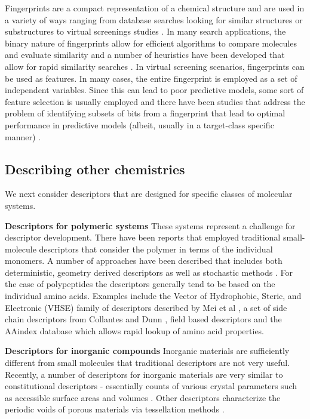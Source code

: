 \documentclass[letterpaper, 12pt]{article}
\begin{document}
Fingerprints are a compact representation of a chemical structure and
are used in a variety of ways ranging from database searches looking
for similar structures or substructures to virtual screenings studies
\cite{Sun:2006kx}. In many search applications, the binary nature of
fingerprints allow for efficient algorithms to compare molecules and
evaluate similarity and a number of heuristics have been developed
that allow for rapid similarity searches
\cite{Baldi:2008aa,Swamidass:2007ab}. In virtual screening scenarios,
fingerprints can be used as features. In many cases, the entire
fingerprint is employed as a set of independent variables. Since this
can lead to poor predictive models, some sort of feature selection is
usually employed and there have been studies that address the problem
of identifying subsets of bits from a fingerprint that lead to optimal
performance in predictive models (albeit, usually in a target-class
specific manner) \cite{Xue:2004fk}.

\subsection{Describing other chemistries}

We next consider descriptors that are designed for specific classes of
molecular systems.

\textbf{Descriptors for polymeric systems} These systems represent a
challenge for descriptor development. There have been reports that
employed traditional small-molecule descriptors
\cite{Mattioni:2002dq,Katritzky:1998cr} that consider the polymer in
terms of the individual monomers. A number of approaches have been
described that includes both deterministic, geometry derived
descriptors \cite{Edvinsson:2003bh} as well as stochastic methods
\cite{Gonzales-Diaz:2003ly}. For the case of polypeptides the
descriptors generally tend to be based on the individual amino
acids. Examples include the Vector of Hydrophobic, Steric, and
Electronic (VHSE) family of descriptors described by Mei et al
\cite{Mei:2005kx}, a set of side chain descriptors from Collantes and
Dunn \cite{Collantes:1995vn}, field based descriptors
\cite{Norinder:1991ys} and the AAindex database
\cite{Kawashima:1999zr} which allows rapid lookup of amino acid
properties.

\textbf{Descriptors for inorganic compounds} Inorganic materials are
sufficiently different from small molecules that traditional
descriptors are not very useful. Recently, a number of descriptors for
inorganic materials are very similar to constitutional descriptors -
essentially counts of various crystal parameters such as accessible
surface areas and volumes
\cite{Willems:2012zr,Haranczyk:2010ys,Mackay:1984ve}. Other
descriptors characterize the periodic voids of porous materials via
tessellation methods \cite{Anurova:2009ly,Carr:2009kx}.
\end{document}
